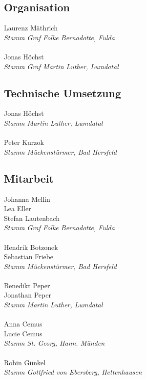 \begin{centering}
\begin{multicols}{2}

\subsection*{Organisation}
Laurenz Mäthrich \\ \textit{Stamm Graf Folke Bernadotte, Fulda} \\ ~\\
Jonas Höchst \\ \textit{Stamm Graf Martin Luther, Lumdatal}

\subsection*{Technische Umsetzung}
Jonas Höchst \\ \textit{Stamm Martin Luther, Lumdatal} \\ ~\\
Peter Kurzok \\ \textit{Stamm Mückenstürmer, Bad Hersfeld}

\subsection*{Mitarbeit}
Johanna Mellin \\ Lea Eller \\ Stefan Lautenbach \\ \textit{Stamm Graf Folke Bernadotte, Fulda} \\ ~\\
Hendrik Botzonek \\ Sebastian Friebe \\ \textit{Stamm Mückenstürmer, Bad Hersfeld} \\ ~\\
Benedikt Peper \\ Jonathan Peper \\ \textit{Stamm Martin Luther, Lumdatal} \\ ~\\
Anna Cemus \\ Lucie Cemus \\ \textit{Stamm St. Georg, Hann. Münden} \\ ~\\
Robin Günkel \\ \textit{Stamm Gottfried von Ebersberg, Hettenhausen} \\


\end{multicols}
\end{centering}
